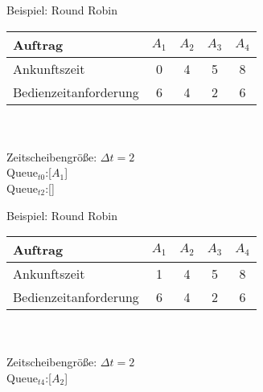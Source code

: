 \begin{frame}{Beispiel: Round Robin}
	\begin{tabular}{l||c|c|c|c}
		Auftrag               & \(A_1\)  & \(A_2\)  & \(A_3\) & \(A_4\) \\ \hline \hline
		Ankunftszeit		  & 0        &  4		& 5       & 8       \\ \hline
		Bedienzeitanforderung & 6        &  4       & 2       & 6       \\
	\end{tabular}\quad \\ \quad \\
	Zeitscheibengröße: \(\Delta t = 2\) \\
	Queue\(_{t0}\):[\(A_1\)] \\
	Queue\(_{t2}\):[] \\
	\begin{center}
	\begin{blockgraph}{25}{1}{0.4}
    \end{blockgraph}
	\end{center}
\end{frame}

\begin{frame}{Beispiel: Round Robin}
	\begin{tabular}{l||c|c|c|c}
		Auftrag               & \(A_1\)  & \(A_2\)  & \(A_3\) & \(A_4\) \\ \hline \hline
		Ankunftszeit		  & 1        &  4		& 5       & 8       \\ \hline
		Bedienzeitanforderung & 6        &  4       & 2       & 6       \\
	\end{tabular}\quad \\ \quad \\
	Zeitscheibengröße: \(\Delta t = 2\) \\
	Queue\(_{t4}\):[\(A_2\)] \\
	\quad \\
	\begin{center}
	\begin{blockgraph}{25}{1}{0.4}
    
    \end{blockgraph}
	\end{center}
\end{frame}

